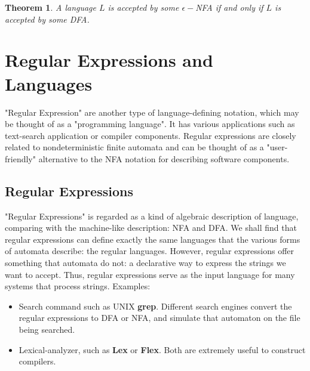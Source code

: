 \documentclass[12pt,reqno]{amsart}
\newtheorem{thm}{Theorem}[section]
\begin{document}
\begin{thm}
	A language $L$ is accepted by some $\epsilon-$NFA if and only if $L$ is accepted by some DFA.
\end{thm}




\section{Regular Expressions and Languages}
"Regular Expression" are another type of language-defining notation, which may be thought of as a "programming language". It has various applications such as text-search application or compiler components. Regular expressions are closely related to nondeterministic finite automata and can be thought of as a "user-friendly" alternative to the NFA notation for describing software components.

\subsection{Regular Expressions}
"Regular Expressions" is regarded as a kind of algebraic description of language, comparing with the machine-like description: NFA and DFA.
We shall find that regular expressions can define exactly the same languages that the various forms of automata describe: the regular languages. However, regular expressions offer something that automata do not: a declarative way to express the strings we want to accept. Thus, regular expressions serve as the input language for many systems that process strings. Examples:
	\begin{itemize}
	\item Search command such as UNIX \textbf{grep}. Different search engines convert the regular expressions to DFA or NFA, and simulate that automaton on the file being searched.
	\item Lexical-analyzer, such as \textbf{Lex} or \textbf{Flex}. Both are extremely useful to construct compilers.
	\end{itemize}
	
\end{document}
